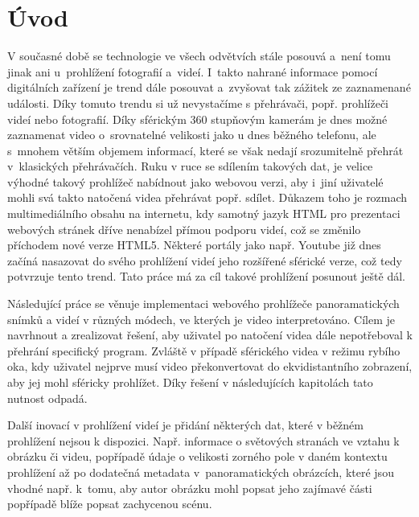 \setcounter{secnumdepth}{4} %



\chapter{Úvod}
\label{chapter:1}

V současné době se technologie ve všech odvětvích stále posouvá a~není tomu jinak ani u~prohlížení fotografií a~videí. I~takto nahrané informace pomocí digitálních zařízení je trend dále posouvat a~zvyšovat tak zážitek ze zaznamenané události. Díky tomuto trendu si už nevystačíme s  přehrávači, popř. prohlížeči videí nebo fotografií. Díky sférickým 360 stupňovým kamerám je dnes možné zaznamenat video o~srovnatelné velikosti jako u dnes běžného telefonu, ale s~mnohem větším objemem informací, které se však nedají srozumitelně přehrát v~klasických přehrávačích. Ruku v ruce se sdílením takových dat, je velice výhodné takový prohlížeč nabídnout jako webovou verzi, aby i~jiní uživatelé mohli svá takto natočená videa přehrávat popř. sdílet. Důkazem toho je rozmach multimediálního obsahu na internetu, kdy samotný jazyk HTML pro prezentaci webových stránek dříve nenabízel přímou podporu videí, což se změnilo příchodem nové verze HTML5. Některé portály jako např. Youtube již dnes začíná nasazovat do svého prohlížení videí jeho rozšířené sférické verze, což tedy potvrzuje tento trend. Tato práce má za cíl takové prohlížení posunout ještě dál.


Následující práce se věnuje implementaci webového prohlížeče panoramatických snímků a videí v různých módech, ve kterých je video interpretováno. Cílem je  navrhnout a zrealizovat řešení, aby uživatel po natočení videa dále nepotřeboval k přehrání specifický program. Zvláště v případě  sférického videa v režimu rybího oka, kdy uživatel nejprve musí video překonvertovat do ekvidistantního zobrazení, aby jej mohl sféricky prohlížet. Díky řešení v následujících kapitolách tato nutnost odpadá. 


Další inovací v prohlížení videí je přidání některých dat, které v běžném prohlížení nejsou k dispozici. Např. informace o světových stranách ve vztahu k obrázku či videu, popřípadě údaje o velikosti zorného pole v daném kontextu prohlížení až po dodatečná metadata v~panoramatických obrázcích, které jsou vhodné např. k~tomu, aby autor obrázku mohl popsat jeho zajímavé části popřípadě blíže popsat zachycenou scénu.
\newline

